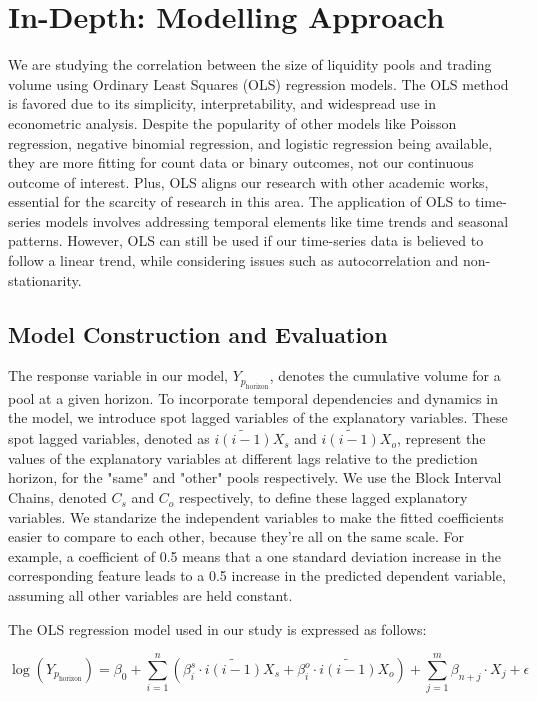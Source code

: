 \documentclass{article}
\begin{document}
\section{\textbf{In-Depth: Modelling Approach}}

We are studying the correlation between the size of liquidity pools and trading volume using Ordinary Least Squares (OLS) regression models. The OLS method is favored due to its simplicity, interpretability, and widespread use in econometric analysis. Despite the popularity of other models like Poisson regression, negative binomial regression, and logistic regression being available, they are more fitting for count data or binary outcomes, not our continuous outcome of interest. Plus, OLS aligns our research with other academic works\cite{Miori2023}, essential for the scarcity of research in this area. The application of OLS to time-series models involves addressing temporal elements like time trends and seasonal patterns. However, OLS can still be used if our time-series data is believed to follow a linear trend, while considering issues such as autocorrelation and non-stationarity.

\subsection{\textbf{Model Construction and Evaluation}}


The response variable in our model, \(Y_{p_{\text{horizon}}}\), denotes the cumulative volume for a pool at a given horizon. To incorporate temporal dependencies and dynamics in the model, we introduce spot lagged variables of the explanatory variables. These spot lagged variables, denoted as \(\widetilde{i(i-1)}X_s\) and \(\widetilde{i(i-1)}X_o\), represent the values of the explanatory variables at different lags relative to the prediction horizon, for the "same" and "other" pools respectively. We use the Block Interval Chains, denoted \(C_s\) and \(C_o\) respectively, to define these lagged explanatory variables. We standarize the independent variables to make the fitted coefficients easier to compare to each other, because they're all on the same scale. For example, a coefficient of 0.5 means that a one standard deviation increase in the corresponding feature leads to a 0.5 increase in the predicted dependent variable, assuming all other variables are held constant.

The OLS regression model used in our study is expressed as follows:

\begin{equation}
  \log(Y_{p_{\text{horizon}}}) = \beta_0 + \sum_{i=1}^{n} \left(\beta_i^s \cdot \widetilde{i(i-1)}X_s + \beta_i^o \cdot \widetilde{i(i-1)}X_o\right) + \sum_{j=1}^{m} \beta_{n+j} \cdot X_j + \epsilon
  \end{equation}
  
\end{document}
